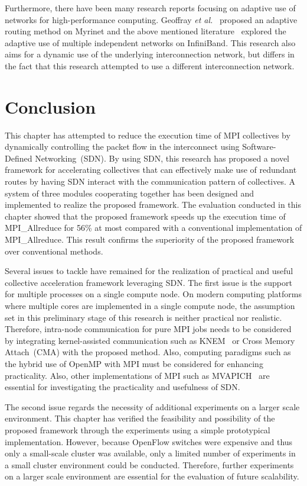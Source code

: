 Furthermore, there have been many research reports focusing on adaptive
use of networks for high-performance computing. Geoffray \emph{et
al.}~\autocite{Geoffray2008} proposed an adaptive routing method on Myrinet
and the above mentioned literature~\autocite{Jiuxing2004} explored the
adaptive use of multiple independent networks on InfiniBand. This research also
aims for a dynamic use of the underlying interconnection network, but differs
in the fact that this research attempted to use a different interconnection
network.

\section{Conclusion}\label{sec:iii-conclusion}

This chapter has attempted to reduce the execution time of MPI
collectives by dynamically controlling the packet flow in the interconnect
using Software-Defined Networking~(SDN).
By using SDN, this research  has proposed a novel framework for accelerating
collectives that can effectively make use of redundant routes by having SDN
interact with the communication pattern of collectives. A system of three
modules cooperating together has been designed and implemented to realize the
proposed framework. The evaluation conducted in this chapter showed that the
proposed framework speeds up the execution time of MPI\_Allreduce for 56\% at
most compared with a conventional implementation of MPI\_Allreduce. This
result confirms the superiority of the proposed framework over conventional
methods.

Several issues to tackle have remained for the realization of practical
and useful collective acceleration framework leveraging SDN\@.
The first issue is the support for multiple processes on a single compute
node. On modern computing platforms where multiple cores are implemented in a
single compute node, the assumption set in this preliminary stage of this
research is neither practical nor realistic. Therefore, intra-node
communication for pure MPI jobs needs to be considered by integrating
kernel-assisted communication such as KNEM~\autocite{Goglin2013} or Cross
Memory Attach~(CMA) with the proposed method. Also, computing paradigms such
as the hybrid use of OpenMP with MPI must be considered for enhancing
practicality. Also, other implementations of MPI such as
MVAPICH~\autocite{mvapich} are essential for investigating the practicality
and usefulness of SDN\@.

The second issue regards the necessity of additional experiments on a
larger scale environment. This chapter has verified the feasibility and
possibility of the proposed framework through the experiments using a simple
prototypical implementation. However, because OpenFlow switches were expensive
and thus only a small-scale cluster was available, only a limited number of
experiments in a small cluster environment could be conducted. Therefore,
further experiments on a larger scale environment are essential for the
evaluation of future scalability.

